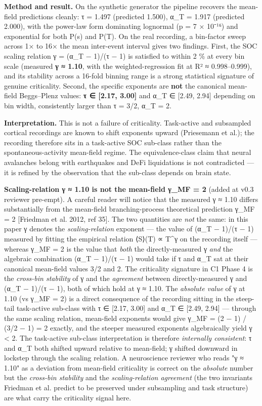 \documentclass[
  11pt]{article}
\begin{document}
\textbf{Method and result.} On the synthetic generator the pipeline
recovers the mean-field predictions cleanly: τ = 1.497 (predicted
1.500), α\_T = 1.917 (predicted 2.000), with the power-law form
dominating lognormal (p = 7 × 10⁻¹⁶) and exponential for both P(s) and
P(T). On the real recording, a bin-factor sweep across 1× to 16× the
mean inter-event interval gives two findings. First, the SOC scaling
relation γ = (α\_T − 1)/(τ − 1) is satisfied to within 2 \% at every bin
scale (measured \textbf{γ ≈ 1.10}, with the weighted-regression fit at
R² ≈ 0.998--0.999), and its stability across a 16-fold binning range is
a strong statistical signature of genuine criticality. Second, the
specific exponents are \textbf{not} the canonical mean-field
Beggs--Plenz values: \textbf{τ ∈ {[}2.17, 3.00{]}} and α\_T ∈ {[}2.49,
2.94{]} depending on bin width, consistently larger than τ = 3/2, α\_T =
2.

\textbf{Interpretation.} This is not a failure of criticality.
Task-active and subsampled cortical recordings are known to shift
exponents upward (Priesemann et al.); the recording therefore sits in a
task-active SOC sub-class rather than the spontaneous-activity
mean-field regime. The equivalence-class claim that neural avalanches
belong with earthquakes and DeFi liquidations is not contradicted --- it
is refined by the observation that the sub-class depends on brain state.

\textbf{Scaling-relation γ ≈ 1.10 is not the mean-field γ\_MF = 2}
(added at v0.3 reviewer pre-empt). A careful reader will notice that the
measured γ ≈ 1.10 differs substantially from the mean-field
branching-process theoretical prediction γ\_MF = 2 {[}Friedman et al.
2012, ref 35{]}. The two quantities are \emph{not} the same: in this
paper γ denotes the \emph{scaling-relation} exponent --- the value of
(α\_T − 1)/(τ − 1) measured by fitting the empirical relation ⟨S⟩(T) ∝
T\^{}γ on the recording itself --- whereas γ\_MF = 2 is the value that
\emph{both} the directly-measured γ \emph{and} the algebraic combination
(α\_T − 1)/(τ − 1) would take if τ and α\_T sat at their canonical
mean-field values 3/2 and 2. The criticality signature in C1 Phase 4 is
the \emph{cross-bin stability} of γ and the \emph{agreement} between
directly-measured γ and (α\_T − 1)/(τ − 1), both of which hold at γ ≈
1.10. The \emph{absolute value} of γ at 1.10 (vs γ\_MF = 2) is a direct
consequence of the recording sitting in the steep-tail task-active
sub-class with τ ∈ {[}2.17, 3.00{]} and α\_T ∈ {[}2.49, 2.94{]} ---
through the same scaling relation, mean-field exponents would give γ\_MF
= (2 − 1) / (3/2 − 1) = 2 exactly, and the steeper measured exponents
algebraically yield γ \textless{} 2. The task-active sub-class
interpretation is therefore \emph{internally consistent}: τ and α\_T
both shifted upward relative to mean-field; γ shifted downward in
lockstep through the scaling relation. A neuroscience reviewer who reads
"γ ≈ 1.10" as a deviation from mean-field criticality is correct on the
\emph{absolute} number but the \emph{cross-bin stability} and the
\emph{scaling-relation agreement} (the two invariants Friedman et al.
predict to be preserved under subsampling and task structure) are what
carry the criticality signal here.
\end{document}
